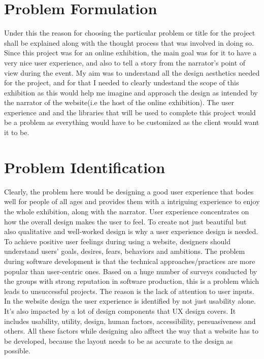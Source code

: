 \section{Problem Formulation}
Under this the reason for choosing the particular problem or title for the project shall be explained along with the thought process that was involved in doing so.
Since this project was for an online exhibition, the main goal was for it to have a very nice user experience, and also to tell a story from the narrator's point of view during the event.
My aim was to understand all the design aesthetics needed for the project, and for that I needed to clearly undestand the scope of this exhibition as this would help me imagine and approach the design as intended by the narrator of the website(i.e the host of the online exhibition).
The user experience and and the libraries that will be used to complete this project would be a problem as everything would have to be customized as the client would want it to be.

\section{Problem Identification}

Clearly, the problem here would be designing a good user experience that bodes well for people of all ages and provides them with a intriguing experience to enjoy the whole exhibition, along with the narrator. User experience concentrates on how the overall design makes the user to feel. To create not just beautiful but also qualitative and well-worked design is why a user experience design is needed. To achieve positive user feelings during using a website, designers should understand users’ goals, desires, fears, behaviors and ambitions. The problem during software development is that the technical approaches/practices are more popular than user-centric ones. Based on a huge number of surveys conducted by the groups with strong reputation in software production, this is a problem which leads to unsuccessful projects. The reason is the lack of attention to user inputs. In the website design the user experience is identified by not just usability alone. It's also impacted by a lot of design components that UX design covers. It includes usability, utility, design, human factors, accessibility, persuasiveness and others. All these factors while designing also afftect the way that a website has to be developed, because the layout needs to be as accurate to the design as possible.


